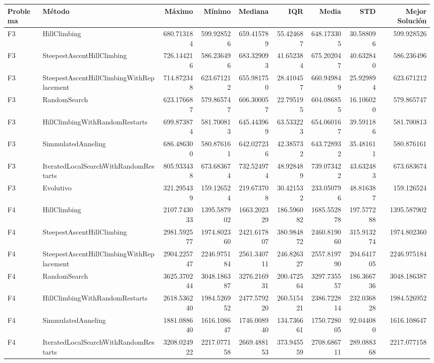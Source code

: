 \begin{tabular}{llrrrrrrr}
\toprule
Problema & Método & Máximo & Mínimo & Mediana & IQR & Media & STD & Mejor Solución \\
\midrule
F3 & HillClimbing & 680.713184 & 599.928526 & 659.415789 & 55.424687 & 648.173305 & 30.588096 & 599.928526 \\
F3 & SteepestAscentHillClimbing & 726.144216 & 586.236496 & 683.329093 & 41.652384 & 675.202047 & 40.632840 & 586.236496 \\
F3 & SteepestAscentHillClimbingWithReplacement & 714.872348 & 623.671212 & 655.981750 & 28.410457 & 660.949849 & 25.929894 & 623.671212 \\
F3 & RandomSearch & 623.176687 & 579.865747 & 606.300057 & 22.795195 & 604.086855 & 16.106020 & 579.865747 \\
F3 & HillClimbingWithRandomRestarts & 699.873874 & 581.700813 & 645.443969 & 63.533223 & 654.060167 & 39.591186 & 581.700813 \\
F3 & SimmulatedAnneling & 686.486300 & 580.876161 & 642.027236 & 42.385732 & 643.728932 & 35.481611 & 580.876161 \\
F3 & IteratedLocalSearchWithRandomRestarts & 805.933438 & 673.683674 & 732.524974 & 48.928489 & 739.073422 & 43.632483 & 673.683674 \\
F3 & Evolutivo & 321.295439 & 159.126524 & 219.673708 & 30.421532 & 233.050796 & 48.816387 & 159.126524 \\
F4 & HillClimbing & 2107.743033 & 1395.587902 & 1663.202329 & 186.596082 & 1685.552878 & 197.577288 & 1395.587902 \\
F4 & SteepestAscentHillClimbing & 2981.592577 & 1974.802360 & 2421.617807 & 380.984872 & 2460.819060 & 315.913274 & 1974.802360 \\
F4 & SteepestAscentHillClimbingWithReplacement & 2904.225747 & 2246.975184 & 2561.340711 & 246.826327 & 2557.819790 & 204.641705 & 2246.975184 \\
F4 & RandomSearch & 3625.370244 & 3048.186387 & 3276.216931 & 200.472564 & 3297.735557 & 186.366736 & 3048.186387 \\
F4 & HillClimbingWithRandomRestarts & 2618.536240 & 1984.526952 & 2477.579220 & 260.515421 & 2386.722814 & 232.036828 & 1984.526952 \\
F4 & SimmulatedAnneling & 1881.088640 & 1616.108647 & 1746.008940 & 134.736661 & 1750.728005 & 92.044080 & 1616.108647 \\
F4 & IteratedLocalSearchWithRandomRestarts & 3208.024922 & 2217.077158 & 2669.488153 & 373.945559 & 2708.686711 & 289.088368 & 2217.077158 \\

\end{tabular}
